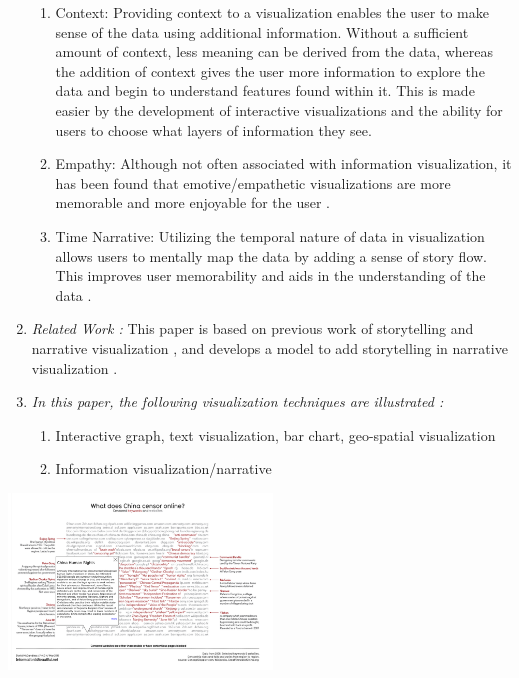 \documentclass{egpubl}
\begin{document}
\begin{enumerate}
\begin{enumerate}
	\item Context: Providing context to a visualization enables the user to make sense of the data using additional information. Without a sufficient amount of context, less meaning can be derived from the data, whereas the addition of context gives the user more information to explore the data and begin to understand features found within it. This is made easier by the development of interactive visualizations and the ability for users to choose what layers of information they see. 
		
	\item Empathy: Although not often associated with information visualization, it has been found that emotive/empathetic visualizations are more memorable and more enjoyable for the user \cite{Kosara}.
		
	\item Time Narrative: Utilizing the temporal nature of data in visualization allows users to mentally map the data by adding a sense of story flow. This improves user memorability and aids in the understanding of the data \cite{Kosara}.
		
\end{enumerate}
\item \textit{Related Work :}  This paper is based on previous work of storytelling \cite{hullman}\cite{sci}\cite{segal} and narrative visualization \cite{fisher}, and develops a model to add storytelling in narrative visualization \cite{figueiras}.
\item \textit{In this paper, the following visualization techniques are illustrated :} 
\begin{enumerate}
\item Interactive graph, text visualization, bar chart, geo-spatial visualization
\item Information visualization/narrative
\end{enumerate}
\end{enumerate}


\begingroup
\centering
\includegraphics[width=7cm]{./images/figueiras14narrative}
\label{fig:figueiras14narrative}
\endgroup
\end{document}
